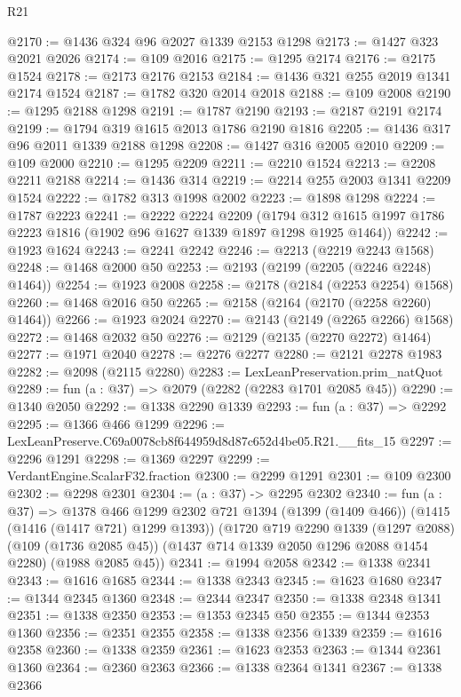 \begin{lexlean}{R21}
\begin{coremodule}
@2170 := @1436 @324 @96 @2027 @1339 @2153 @1298
@2173 := @1427 @323 @2021 @2026
@2174 := @109 @2016
@2175 := @1295 @2174
@2176 := @2175 @1524
@2178 := @2173 @2176 @2153
@2184 := @1436 @321 @255 @2019 @1341 @2174 @1524
@2187 := @1782 @320 @2014 @2018
@2188 := @109 @2008
@2190 := @1295 @2188 @1298
@2191 := @1787 @2190
@2193 := @2187 @2191 @2174
@2199 := @1794 @319 @1615 @2013 @1786 @2190 @1816
@2205 := @1436 @317 @96 @2011 @1339 @2188 @1298
@2208 := @1427 @316 @2005 @2010
@2209 := @109 @2000
@2210 := @1295 @2209
@2211 := @2210 @1524
@2213 := @2208 @2211 @2188
@2214 := @1436 @314
@2219 := @2214 @255 @2003 @1341 @2209 @1524
@2222 := @1782 @313 @1998 @2002
@2223 := @1898 @1298
@2224 := @1787 @2223
@2241 := @2222
    @2224
    @2209
    (@1794 @312 @1615 @1997 @1786 @2223 @1816 (@1902 @96 @1627 @1339 @1897 @1298 @1925 @1464))
@2242 := @1923 @1624
@2243 := @2241 @2242
@2246 := @2213 (@2219 @2243 @1568)
@2248 := @1468 @2000 @50
@2253 := @2193 (@2199 (@2205 (@2246 @2248) @1464))
@2254 := @1923 @2008
@2258 := @2178 (@2184 (@2253 @2254) @1568)
@2260 := @1468 @2016 @50
@2265 := @2158 (@2164 (@2170 (@2258 @2260) @1464))
@2266 := @1923 @2024
@2270 := @2143 (@2149 (@2265 @2266) @1568)
@2272 := @1468 @2032 @50
@2276 := @2129 (@2135 (@2270 @2272) @1464)
@2277 := @1971 @2040
@2278 := @2276 @2277
@2280 := @2121 @2278 @1983
@2282 := @2098 (@2115 @2280)
@2283 := LexLeanPreservation.prim_natQuot
@2289 := fun (a : @37) => @2079 (@2282 (@2283 @1701 @2085 @45))
@2290 := @1340 @2050
@2292 := @1338 @2290 @1339
@2293 := fun (a : @37) => @2292
@2295 := @1366 @466 @1299
@2296 := LexLeanPreserve.C69a0078cb8f644959d8d87c652d4be05.R21.__fits_15
@2297 := @2296 @1291
@2298 := @1369 @2297
@2299 := VerdantEngine.ScalarF32.fraction
@2300 := @2299 @1291
@2301 := @109 @2300
@2302 := @2298 @2301
@2304 := (a : @37) -> @2295 @2302
@2340 := fun (a : @37) =>
  @1378
    @466
    @1299
    @2302
    @721
    @1394
    (@1399 (@1409 @466))
    (@1415 (@1416 (@1417 @721) @1299 @1393))
    (@1720
      @719
      @2290
      @1339
      (@1297 @2088)
      (@109 (@1736 @2085 @45))
      (@1437 @714 @1339 @2050 @1296 @2088 @1454 @2280)
      (@1988 @2085 @45))
@2341 := @1994 @2058
@2342 := @1338 @2341
@2343 := @1616 @1685
@2344 := @1338 @2343
@2345 := @1623 @1680
@2347 := @1344 @2345 @1360
@2348 := @2344 @2347
@2350 := @1338 @2348 @1341
@2351 := @1338 @2350
@2353 := @1353 @2345 @50
@2355 := @1344 @2353 @1360
@2356 := @2351 @2355
@2358 := @1338 @2356 @1339
@2359 := @1616 @2358
@2360 := @1338 @2359
@2361 := @1623 @2353
@2363 := @1344 @2361 @1360
@2364 := @2360 @2363
@2366 := @1338 @2364 @1341
@2367 := @1338 @2366

\end{coremodule}
\end{lexlean}
